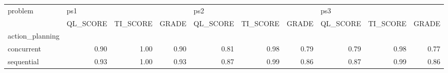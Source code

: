 \begin{tabular}{lrrrrrrrrr}
\toprule
problem & \multicolumn{3}{l}{ps1} & \multicolumn{3}{l}{ps2} & \multicolumn{3}{l}{ps3} \\
{} & QL\_SCORE & TI\_SCORE & GRADE & QL\_SCORE & TI\_SCORE & GRADE & QL\_SCORE & TI\_SCORE & GRADE \\
action\_planning &          &          &       &          &          &       &          &          &       \\
\midrule
concurrent      &     0.90 &     1.00 &  0.90 &     0.81 &     0.98 &  0.79 &     0.79 &     0.98 &  0.77 \\
sequential      &     0.93 &     1.00 &  0.93 &     0.87 &     0.99 &  0.86 &     0.87 &     0.99 &  0.86 \\
\bottomrule
\end{tabular}
